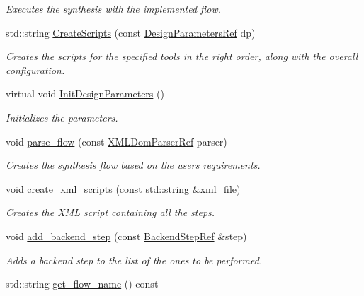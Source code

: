 \begin{DoxyCompactItemize}
\begin{DoxyCompactList}\small\item\em Executes the synthesis with the implemented flow. \end{DoxyCompactList}\item 
std\+::string \hyperlink{classBackendFlow_a646198b57b1a235564a955e1f48945bd}{Create\+Scripts} (const \hyperlink{DesignParameters_8hpp_ae36bb1c4c9150d0eeecfe1f96f42d157}{Design\+Parameters\+Ref} dp)
\begin{DoxyCompactList}\small\item\em Creates the scripts for the specified tools in the right order, along with the overall configuration. \end{DoxyCompactList}\item 
virtual void \hyperlink{classBackendFlow_a367d9917dc257ed6aa0bb5e97f57d2d4}{Init\+Design\+Parameters} ()
\begin{DoxyCompactList}\small\item\em Initializes the parameters. \end{DoxyCompactList}\item 
void \hyperlink{classBackendFlow_a70e196e669a5be2bc954b4aec6852add}{parse\+\_\+flow} (const \hyperlink{xml__dom__parser_8hpp_a5e6373a495d2b6b4aef3179a48a4ceaf}{X\+M\+L\+Dom\+Parser\+Ref} parser)
\begin{DoxyCompactList}\small\item\em Creates the synthesis flow based on the user\textquotesingle{}s requirements. \end{DoxyCompactList}\item 
void \hyperlink{classBackendFlow_a8c03d242a9fa1394a2721c9c5363e6ed}{create\+\_\+xml\+\_\+scripts} (const std\+::string \&xml\+\_\+file)
\begin{DoxyCompactList}\small\item\em Creates the X\+ML script containing all the steps. \end{DoxyCompactList}\item 
void \hyperlink{classBackendFlow_af68bbc810207b55865e16f5ef0b4a043}{add\+\_\+backend\+\_\+step} (const \hyperlink{BackendFlow_8hpp_ab49214bb532f4d4cce15fd2e89eff5d7}{Backend\+Step\+Ref} \&step)
\begin{DoxyCompactList}\small\item\em Adds a backend step to the list of the ones to be performed. \end{DoxyCompactList}\item 
std\+::string \hyperlink{classBackendFlow_a419ea98a3481cb6789fc4f216ed231bb}{get\+\_\+flow\+\_\+name} () const

\end{DoxyCompactItemize}
